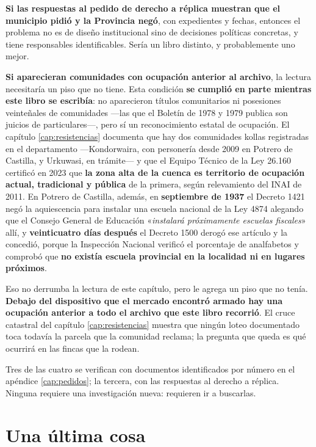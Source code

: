 \textbf{Si las respuestas al pedido de derecho a réplica muestran que el municipio pidió y la
Provincia negó}, con expedientes y fechas, entonces el problema no es de diseño institucional
sino de decisiones políticas concretas, y tiene responsables identificables. Sería un libro
distinto, y probablemente uno mejor.

\textbf{Si aparecieran comunidades con ocupación anterior al archivo}, la lectura necesitaría un piso que no tiene. Esta condición \textbf{se cumplió en parte mientras este libro se escribía}: no aparecieron títulos comunitarios ni posesiones veinteñales de comunidades ---las que el Boletín de 1978 y 1979 publica son juicios de particulares---, pero sí un reconocimiento estatal de ocupación. El capítulo \ref{cap:resistencias} documenta que hay dos comunidades kollas registradas
en el departamento ---Kondorwaira, con personería desde 2009 en Potrero de Castilla, y
Urkuwasi, en trámite--- y que el Equipo Técnico de la Ley 26.160 certificó en 2023 que
\textbf{la zona alta de la cuenca es territorio de ocupación actual, tradicional y pública} de
la primera, según relevamiento del INAI de 2011. En Potrero de Castilla, además, en
\textbf{septiembre de 1937} el Decreto 1421 negó la aquiescencia para instalar una escuela
nacional de la Ley 4874 alegando que el Consejo General de Educación «\textit{instalará
próximamente escuelas fiscales}» allí, y \textbf{veinticuatro días después} el Decreto 1500
derogó ese artículo y la concedió, porque la Inspección Nacional verificó el porcentaje de
analfabetos y comprobó que \textbf{no existía escuela provincial en la localidad ni en lugares
próximos}.

Eso no derrumba la lectura de este capítulo, pero le agrega un piso que no tenía.
\textbf{Debajo del dispositivo que el mercado encontró armado hay una ocupación anterior a
todo el archivo que este libro recorrió}. El cruce catastral del capítulo \ref{cap:resistencias} muestra que ningún loteo documentado toca todavía la parcela que la comunidad reclama; la pregunta que queda es qué ocurrirá en las fincas que la rodean.

Tres de las cuatro se verifican con documentos identificados por número en el apéndice \ref{cap:pedidos}; la tercera, con las respuestas al derecho a réplica. Ninguna
requiere una investigación nueva: requieren ir a buscarlas.

\section{Una última cosa}

